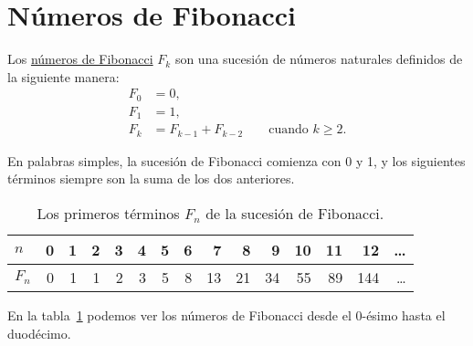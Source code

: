 \section{Números de Fibonacci}

Los
\href{http://es.wikipedia.org/wiki/N\%C3\%BAmeros\_de\_Fibonacci}{números
de Fibonacci} \(F_k\) son una sucesión de números naturales definidos de
la siguiente manera:
\begin{align*}
  F_0 &= 0, \\
  F_1 &= 1, \\
  F_k &= F_{k - 1} + F_{k - 2} \qquad\text{cuando } k\ge 2.
\end{align*}

En palabras simples, la sucesión de Fibonacci comienza con 0 y 1, y los
siguientes términos siempre son la suma de los dos anteriores.

\begin{table}
  \centering
  \begin{tabular}{l*{14}{r}}
    \toprule
    $n$   & 0 & 1 & 2 & 3 & 4 & 5 & 6 &  7 &  8 &  9 & 10 & 11 &  12 & \ldots{} \\
    \midrule
    $F_n$ & 0 & 1 & 1 & 2 & 3 & 5 & 8 & 13 & 21 & 34 & 55 & 89 & 144 & \ldots{} \\
    \bottomrule
  \end{tabular}
  \caption{Los primeros términos \(F_n\) de la sucesión de Fibonacci.}
  \label{tbl:fibonacci}
\end{table}

En la tabla~\ref{tbl:fibonacci} podemos ver los números de Fibonacci desde el
0-ésimo hasta el duodécimo.

